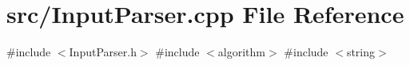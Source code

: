 \section{src/\+Input\+Parser.cpp File Reference}
\label{_input_parser_8cpp}
{\ttfamily \#include $<$Input\+Parser.\+h$>$}\newline
{\ttfamily \#include $<$algorithm$>$}\newline
{\ttfamily \#include $<$string$>$}\newline
